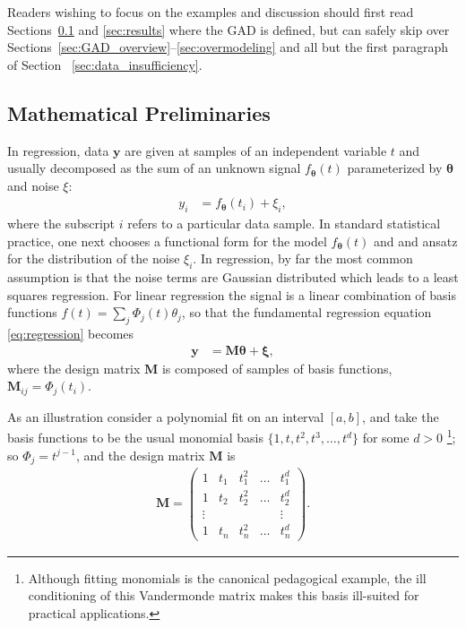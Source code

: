 \documentclass[twocolumn,aps,prx,superscriptaddress,10pt]{revtex4-2}
\newcommand{\by}{\bm{y}}
\newcommand{\y}{\by}  %
\newcommand{\0}{\bm{0}}
\newcommand{\btheta}{\boldsymbol{\theta}}
\newcommand{\bxi}{\boldsymbol{\xi}}
\newcommand{\bbM}{\mathbf{M}}
\begin{document}
 Readers wishing to focus on the examples and discussion should first read Sections~\ref{sec:aliasing} and \ref{sec:results} where the GAD is defined, but can safely skip over Sections~\ref{sec:GAD_overview}--\ref{sec:overmodeling} and all but the first paragraph of Section~ \ref{sec:data_insufficiency}. 


\subsection{Mathematical Preliminaries}
\label{sec:aliasing}

 
In regression, data $\y$ are given at samples of an independent variable $t$ and usually decomposed as the sum of an unknown signal $f_{\btheta}(t)$ parameterized by $\btheta$ and noise $\xi$:
\begin{align}
  \label{eq:regression}
  y_i & = f_{\btheta}(t_i) + \xi_i,
\end{align}
where the subscript $i$ refers to a particular data sample.
In standard statistical practice, one next chooses a functional form for the model $f_{\btheta} (t)$ and and ansatz for the distribution of the noise $\xi_i$.
In regression, by far the most common assumption is that the noise terms are Gaussian distributed which leads to a least squares regression.
For linear regression the signal is a linear combination of basis functions $f(t) = \sum_j \Phi_j(t) \theta_j$, so that the fundamental regression equation \eqref{eq:regression} becomes
\begin{align}
  \label{eq:linearregression}
  \y & = \bbM \btheta + \bxi,
\end{align}
where the design matrix $\bbM$ is composed of samples of basis functions, $\bbM_{ij} = \Phi_j(t_i)$.

As an illustration consider a polynomial fit on an interval $[a,b]$, and
take the basis functions to be the usual monomial basis $\{1, t, t^2, t^3, \dots, t^d\}$ for some $d>0$ \footnote{Although fitting monomials is the canonical pedagogical example, the ill conditioning of this Vandermonde matrix makes this basis ill-suited for practical applications.}; so $\Phi_j = t^{j-1}$, and the design matrix $\bbM$ is 
\begin{align}
    \label{eq:Vandermonde}
\bbM = \begin{pmatrix}
1 & t_1 & t_1^2 & \dots & t_1^d\\
1 & t_2 & t_2^2 & \dots & t_2^d\\
\vdots & & & & \vdots\\
1 & t_n & t_n^2 & \dots & t_n^d
    \end{pmatrix}.
\end{align}
\end{document}
